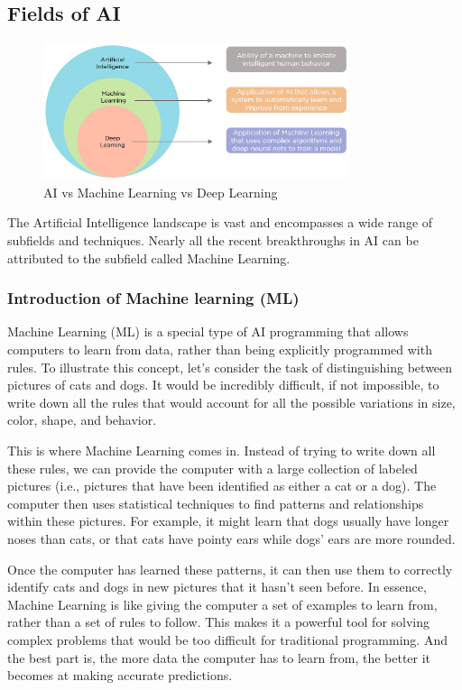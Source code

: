 \documentclass{article}
\begin{document}
\subsection{Fields of AI}

\begin{figure} %
    \centering
    \includegraphics[width=0.8\textwidth]{images/AI_ML_DL.png}
    \caption{AI vs Machine Learning vs Deep Learning \cite{simplilearn_ai_ml_dl}}
\end{figure}



The Artificial Intelligence landscape is vast and encompasses a wide range
of subfields and techniques. Nearly all the recent breakthroughs in AI
can be attributed to the subfield called Machine Learning.

\subsubsection{Introduction of Machine learning (ML)}

Machine Learning (ML) is a special type of AI programming that allows
computers to learn from data, rather than being explicitly programmed
with rules. To illustrate this concept, let's consider the task of
distinguishing between pictures of cats and dogs. It would be incredibly
difficult, if not impossible, to write down all the rules that would
account for all the possible variations in size, color, shape, and
behavior.

This is where Machine Learning comes in. Instead of trying to write down
all these rules, we can provide the computer with a large collection of
labeled pictures (i.e., pictures that have been identified as either a cat
or a dog). The computer then uses statistical techniques to find patterns
and relationships within these pictures. For example, it might learn that
dogs usually have longer noses than cats, or that cats have pointy ears
while dogs' ears are more rounded.

Once the computer has learned these patterns, it can then use them
to correctly identify cats and dogs in new pictures that it hasn't
seen before. In essence, Machine Learning is like giving the computer
a set of examples to learn from, rather than a set of rules to follow.
This makes it a powerful tool for solving complex problems that would
be too difficult for traditional programming. And the best part is,
the more data the computer has to learn from, the better it becomes
at making accurate predictions.
\end{document}
